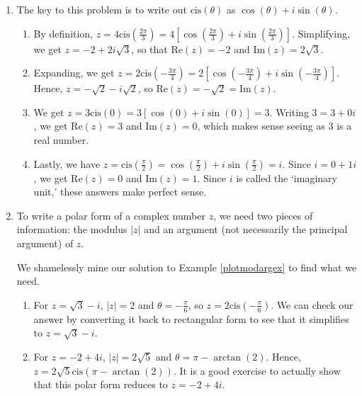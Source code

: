 \documentclass{ximera}
\begin{document}
\begin{example}
\begin{enumerate}
\item The key to this problem is to write out $\text{cis}(\theta)$ as $\cos(\theta) + i\sin(\theta)$.

\begin{enumerate}

\item By definition, $z =4 \text{cis}\left(\frac{2\pi}{3}\right) = 4\left[\cos\left(\frac{2\pi}{3}\right) + i \sin\left(\frac{2\pi}{3}\right)\right]$.  Simplifying, we get $z = -2 + 2i\sqrt{3}$, so that $\text{Re}(z) = -2$ and $\text{Im}(z) = 2\sqrt{3}$.

\item Expanding, we get $z = 2 \text{cis}\left(-\frac{3\pi}{4}\right) = 2\left[\cos\left(-\frac{3\pi}{4}\right) + i \sin\left(-\frac{3\pi}{4}\right)\right]$. Hence, $z= -\sqrt{2} - i\sqrt{2}$, so $\text{Re}(z) = -\sqrt{2} = \text{Im}(z)$.

\item  We get  $z = 3 \text{cis}(0) = 3\left[\cos(0) + i\sin(0)\right] = 3$.  Writing $3 = 3 + 0i$, we get $\text{Re}(z) = 3$ and $\text{Im}(z) = 0$, which makes sense seeing as $3$ is a real number.

\item  Lastly, we have  $z = \text{cis}\left(\frac{\pi}{2}\right) = \cos\left(\frac{\pi}{2}\right)+ i\sin\left(\frac{\pi}{2}\right) = i$.  Since $i = 0 + 1i$, we get $\text{Re}(z) = 0$ and $\text{Im}(z) = 1$.  Since $i$ is called the `imaginary unit,'  these answers make perfect sense.

\end{enumerate}

\item  To write a polar form of a complex number $z$, we need two pieces of information:  the modulus $|z|$ and an argument (not necessarily the principal argument) of $z$.   

\smallskip

We shamelessly mine our solution to  Example \ref{plotmodargex} to find what we need.

\begin{enumerate}

\item  For $z = \sqrt{3}-i$, $|z| = 2$ and $\theta = -\frac{\pi}{6}$, so $z = 2 \text{cis}\left(-\frac{\pi}{6}\right)$.  We can check our answer by converting it back to rectangular form to see that it simplifies to $z = \sqrt{3} - i$.

\item  For $z = -2+4i$, $|z| = 2\sqrt{5}$ and $\theta = \pi - \arctan(2)$.  Hence, $z = 2\sqrt{5} \text{cis}(\pi - \arctan(2))$.  It is a good exercise to actually show that this polar form reduces to $z=-2+4i$.


\end{enumerate}
\end{enumerate}
\end{example}
\end{document}
